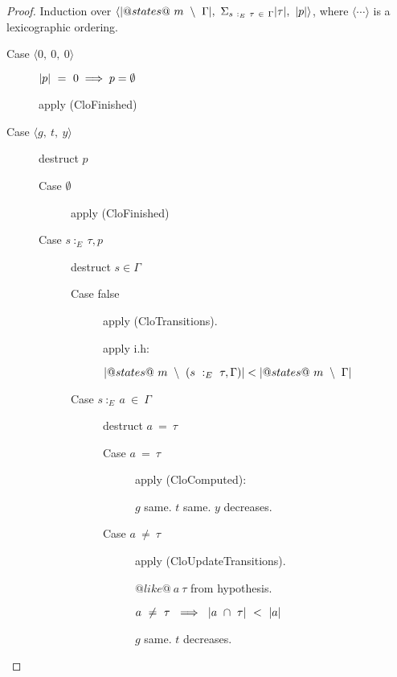 \begin{proof}
Induction over $\langle |@states@~m~\setminus~\Gamma|,~\Sigma_{s~:_E~\tau~\in~\Gamma}|\tau|,~|p| \rangle$, where $\langle \cdots \rangle$ is a lexicographic ordering.

\begin{description}
\item[Case $\langle 0,~0,~0 \rangle$]

$|p|~=~0 \implies p=\emptyset$

apply (CloFinished)

\item[Case $\langle g,~t,~y \rangle$]

destruct $p$
\begin{description}
\item[Case $\emptyset$]

apply (CloFinished)

\item[Case $s~:_E~\tau, p$]

destruct $s \in \Gamma$
\begin{description}
\item[Case false]

apply (CloTransitions).

apply i.h:

$|@states@~m~\setminus~(s~:_E~\tau, \Gamma)| < |@states@~m~\setminus~\Gamma|$

\item[Case $s~:_E~a~\in~\Gamma$]

destruct $a~=~\tau$
\begin{description}
\item[Case $a~=~\tau$]

apply (CloComputed):

$g$ same. $t$ same. $y$ decreases.

\item[Case $a~\not=~\tau$]

apply (CloUpdateTransitions).

$@like@~a~\tau$ from hypothesis.

$a~\not=~\tau~\implies~|a~\cap~\tau|~<~|a|$


$g$ same. $t$ decreases.
\end{description}
\end{description}
\end{description}
\end{description}
    


\end{proof}


